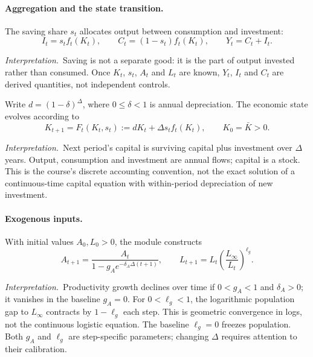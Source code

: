 \documentclass[11pt,a4paper]{article}
\newcommand{\interp}{\par\smallskip\noindent\textit{Interpretation.}\ }
\begin{document}
\paragraph{Aggregation and the state transition.}
The saving share $s_t$ allocates output between consumption and investment:
\begin{equation}\label{eq:resources}
 I_t=s_t f_t(K_t),\qquad C_t=(1-s_t)f_t(K_t),
 \qquad Y_t=C_t+I_t.
\end{equation}
\interp Saving is not a separate good: it is the part of output invested
rather than consumed. Once $K_t$, $s_t$, $A_t$ and $L_t$ are known,
$Y_t$, $I_t$ and $C_t$ are derived quantities, not independent controls.

Write $d=(1-\delta)^\Delta$, where $0\leq\delta<1$ is annual depreciation.
The economic state evolves according to
\begin{equation}\label{eq:capital}
 K_{t+1}=F_t(K_t,s_t):=dK_t+\Delta s_t f_t(K_t),
 \qquad K_0=\bar K>0.
\end{equation}
\interp Next period's capital is surviving capital plus investment over
$\Delta$ years. Output, consumption and investment are annual flows; capital
is a stock. This is the course's discrete accounting convention, not the
exact solution of a continuous-time capital equation with within-period
depreciation of new investment.

\paragraph{Exogenous inputs.}
With initial values $A_0,L_0>0$, the module constructs
\begin{equation}\label{eq:drivers}
 A_{t+1}=\frac{A_t}{1-g_Ae^{-\delta_A\Delta(t+1)}},
 \qquad
 L_{t+1}=L_t\left(\frac{L_\infty}{L_t}\right)^{\ell_g}.
\end{equation}
\interp Productivity growth declines over time if $0<g_A<1$ and
$\delta_A>0$; it vanishes in the baseline $g_A=0$. For $0<\ell_g<1$,
the logarithmic population gap to $L_\infty$ contracts by $1-\ell_g$
each step. This is geometric convergence in logs, not the continuous
logistic equation. The baseline $\ell_g=0$ freezes population.
Both $g_A$ and $\ell_g$ are step-specific parameters; changing $\Delta$
requires attention to their calibration.
\end{document}
